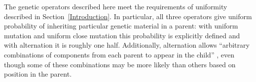 \documentclass[graybox]{svmult}
\begin{document}
The genetic operators described here meet the requirements of uniformity described in Section~\ref{Introduction}. In particular, all three operators give uniform probability of inheriting particular genetic material in a parent: with uniform mutation and uniform close mutation this probability is explicitly defined and with alternation it is roughly one half. Additionally, alternation allows ``arbitrary combinations of components from each parent to appear in the child'' \cite{Spector:2013:GPTP}, even though some of these combinations may be more likely than others based on position in the parent.





\end{document}
